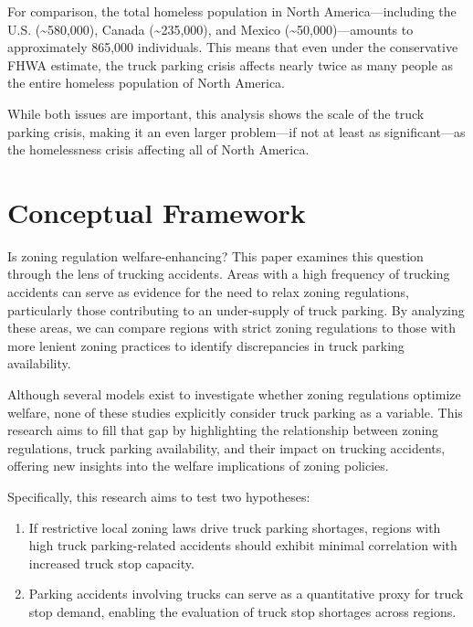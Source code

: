 \documentclass[
  12pt]{article}
\begin{document}
For comparison, the total homeless population in North
America---including the U.S. (\textasciitilde580,000), Canada
(\textasciitilde235,000), and Mexico (\textasciitilde50,000)---amounts
to approximately 865,000 individuals. This means that even under the
conservative FHWA estimate, the truck parking crisis affects nearly
twice as many people as the entire homeless population of North America.

While both issues are important, this analysis shows the scale of the
truck parking crisis, making it an even larger problem---if not at least
as significant---as the homelessness crisis affecting all of North
America.

\hypertarget{conceptual-framework}{%
\section{Conceptual Framework}\label{conceptual-framework}}

Is zoning regulation welfare-enhancing? This paper examines this
question through the lens of trucking accidents. Areas with a high
frequency of trucking accidents can serve as evidence for the need to
relax zoning regulations, particularly those contributing to an
under-supply of truck parking. By analyzing these areas, we can compare
regions with strict zoning regulations to those with more lenient zoning
practices to identify discrepancies in truck parking availability.

Although several models exist to investigate whether zoning regulations
optimize welfare, none of these studies explicitly consider truck
parking as a variable. This research aims to fill that gap by
highlighting the relationship between zoning regulations, truck parking
availability, and their impact on trucking accidents, offering new
insights into the welfare implications of zoning policies.

Specifically, this research aims to test two hypotheses:

\begin{enumerate}
\def\labelenumi{\arabic{enumi}.}
\item
  If restrictive local zoning laws drive truck parking shortages,
  regions with high truck parking-related accidents should exhibit
  minimal correlation with increased truck stop capacity.
\item
  Parking accidents involving trucks can serve as a quantitative proxy
  for truck stop demand, enabling the evaluation of truck stop shortages
  across regions.
\end{enumerate}
\end{document}
